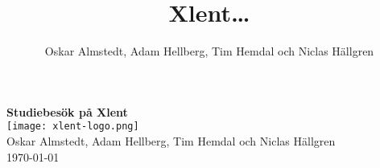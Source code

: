 \documentclass[12pt,a4paper]{report}
\title{Xlent\ldots}
\author{Oskar Almstedt, Adam Hellberg, Tim Hemdal och Niclas Hällgren}
\begin{document}
    \begin{titlepage}
    \begin{center}
    {\Huge\bfseries Studiebesök på Xlent}\\[2cm]
    
    \texttt{[image: xlent-logo.png]}\\[4cm]
    
    Oskar Almstedt, Adam Hellberg, Tim Hemdal och Niclas Hällgren\\[2cm]
    
    \today
    \end{center}
    \end{titlepage}
    
    
    
    
    
    
    
    
\end{document}
